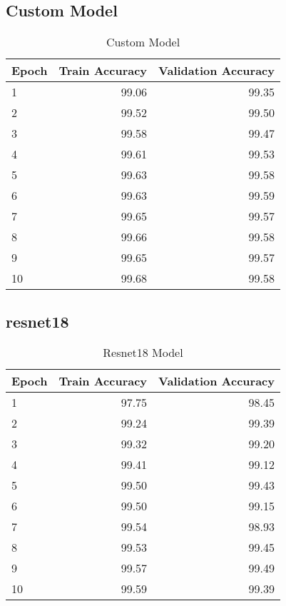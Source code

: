 \documentclass[a4paper,11pt,titlepage]{jsarticle}
\begin{document}
\subsection{Custom Model}
\begin{table}[H]
\centering
\caption{Custom Model}
\label{tab:Custom}
\begin{tabular}{lrr}
\hline
  Epoch &   Train Accuracy &   Validation Accuracy \\
\hline
      1 &             99.06 &                  99.35 \\
      2 &             99.52 &                  99.50 \\
      3 &             99.58 &                  99.47 \\
      4 &             99.61 &                  99.53 \\
      5 &             99.63 &                  99.58 \\
      6 &             99.63 &                  99.59 \\
      7 &             99.65 &                  99.57 \\
      8 &             99.66 &                  99.58 \\
      9 &             99.65 &                  99.57 \\
     10 &             99.68 &                  99.58 \\
\hline
\end{tabular}
\end{table}



\subsection{resnet18}

\begin{table}[H]
\centering
\caption{Resnet18 Model}
\label{tab:Resnet18}
\begin{tabular}{lrr}
\hline
  Epoch &   Train Accuracy &   Validation Accuracy \\
\hline
      1 &             97.75 &                  98.45 \\
      2 &             99.24 &                  99.39 \\
      3 &             99.32 &                  99.20 \\
      4 &             99.41 &                  99.12 \\
      5 &             99.50 &                  99.43 \\
      6 &             99.50 &                  99.15 \\
      7 &             99.54 &                  98.93 \\
      8 &             99.53 &                  99.45 \\
      9 &             99.57 &                  99.49 \\
     10 &             99.59 &                  99.39 \\
\hline
\end{tabular}
\end{table}
\end{document}
